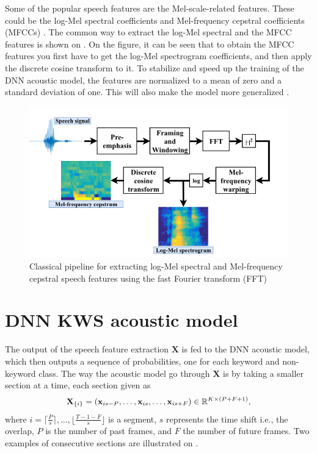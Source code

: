 Some of the popular speech features are the Mel-scale-related features. These could be the log-Mel spectral coefficients and Mel-frequency cepstral coefficients (MFCCs) \cite{lopez2021deep}. The common way to extract the log-Mel spectral and the MFCC features is shown on . On the figure, it can be seen that to obtain the MFCC features you first have to get the log-Mel spectrogram coefficients, and then apply the discrete cosine transform to it. To stabilize and speed up the training of the DNN acoustic model, the features are normalized to a mean of zero and a standard deviation of one. This will also make the model more generalized \cite{lopez2021deep}. 

\begin{figure}[h]
    \centering
    \includegraphics[width=\textwidth]{incl/img/kws/MFCC.png}
    \caption{ Classical pipeline for extracting log-Mel spectral and
    Mel-frequency cepstral speech features using the fast Fourier transform
    (FFT) \cite{lopez2021deep}}
    \label{fig:MFCC}
\end{figure}


\section{DNN KWS acoustic model}
The output of the speech feature extraction \(\textbf{X}\) is fed to the DNN acoustic model, which then outputs a sequence of probabilities, one for each keyword and non-keyword class. The way the acoustic model go through \(\textbf{X}\) is by taking a smaller section at a time, each section given as
\begin{align}
    \textbf{X}_{\{i\}} = \qty(\textbf{x}_{is-P}, \dots, \textbf{x}_{is}, \dots, \textbf{x}_{is+F}) \in \mathbb{R}^{K\times (P+F+1)},
\end{align} 
where \(i = \lceil \frac{P}{s} \rceil, \dots, \lfloor \frac{T-1-F}{s} \rfloor\) is a segment, \(s\) represents the time shift i.e., the overlap, \(P\) is the number of past frames, and \(F\) the number of future frames. Two examples of consecutive sections are illustrated on . 

